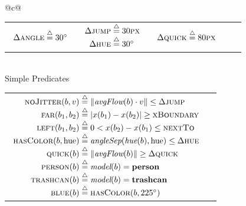 \begin{table}
{\begin{tabular}{@{}c@{}}
\begin{tabular}{@{}c@{\hspace*{2ex}}c@{\hspace*{2ex}}c@{\hspace*{2ex}}c@{\hspace*{2ex}}c@{}}
\begin{math}
\begin{array}[t]{r@{\;\define\;}l}
            \Delta\textsc{angle} & 30\degr\\
          \end{array}
        \end{math}&
        \begin{math}
          \begin{array}[t]{r@{\;\define\;}l}
            \Delta\textsc{jump} & 30\textsc{px}\\
            \Delta\textsc{hue} & 30\degr
          \end{array}
        \end{math}&
        \begin{math}
          \begin{array}[t]{r@{\;\define\;}l}
            \Delta\textsc{quick} & 80\textsc{px}
          \end{array}
        \end{math}
      \end{tabular}\\
      \midrule Simple Predicates\\ \midrule \addlinespace[1ex]
      \begin{tabular}{@{}c@{\hspace{5ex}}c@{}}
        \begin{math}
          \begin{array}[t]{r@{\;\define\;}l}
            \textsc{noJitter}(b,v) &
            \lVert\textit{avgFlow}(b)\cdot v\rVert\le\Delta\textsc{jump}\\
            \textsc{far}(b_1,b_2) &
            \lvert x(b_1)-x(b_2)\rvert\ge\textsc{xBoundary}\\
            \textsc{left}(b_1,b_2) &
            0<x(b_2)-x(b_1)\le\textsc{nextTo}\\
            \textsc{hasColor}(b,\textrm{hue}) &
            \textit{angleSep}(\textit{hue}(b),\textrm{hue})\le
            \Delta\textsc{hue}\\
            \textsc{quick}(b) &
            \lVert\textit{avgFlow}(b)\rVert\ge\Delta\textsc{quick}\\
            \textsc{person}(b) & \textit{model}(b)=\textbf{person}\\
            \textsc{trashcan}(b) & \textit{model}(b)=\textbf{trashcan}\\
            \textsc{blue}(b) & \textsc{hasColor}(b,225^\circ)
          \end{array}
        \end{math}&
        \begin{math}

\end{math}
\end{tabular}
\end{tabular}}
\end{table}
